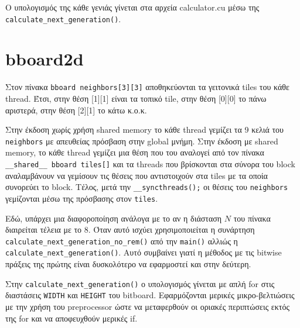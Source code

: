 \begin{sloppypar}
Ο υπολογισμός της κάθε γενιάς γίνεται στα αρχεία calculator.cu μέσω της \lstinline!calculate_next_generation()!.
\end{sloppypar}

\section{bboard2d}
\begin{sloppypar}
Στον πίνακα \lstinline!bboard neighbors[3][3]! αποθηκεύονται τα γειτονικά tiles του κάθε thread.
Έτσι, στην θέση [1][1] είναι τα τοπικό tile,
στην θέση [0][0] το πάνω αριστερά,
στην θέση [2][1] το κάτω κ.ο.κ.
\end{sloppypar}
\begin{sloppypar}
Στην έκδοση χωρίς χρήση shared memory το κάθε thread γεμίζει τα 9 κελιά του \lstinline!neighbors! με απευθείας πρόσβαση στην global μνήμη.
Στην έκδοση με shared memory, το κάθε thread γεμίζει μια θέση που του αναλογεί από τον πίνακα
\lstinline!__shared__ bboard tiles[]! και
τα threads που βρίσκονται στα σύνορα του block αναλαμβάνουν να γεμίσουν τις θέσεις που
αντιστοιχούν στα tiles με τα οποία συνορεύει το block.
Τέλος, μετά την \lstinline!__syncthreads();! οι θέσεις του \lstinline!neighbors! γεμίζονται
μέσω της πρόσβασης στον \lstinline!tiles!.
\end{sloppypar}

\begin{sloppypar}
Εδώ, υπάρχει μια διαφοροποίηση ανάλογα με το αν η διάσταση $N$ του πίνακα διαιρείται τέλεια με το 8.
Όταν αυτό ισχύει χρησιμοποιείται η συνάρτηση \lstinline!calculate_next_generation_no_rem()!
από την \lstinline!main()! αλλιώς η \lstinline!calculate_next_generation()!.
Αυτό συμβαίνει γιατί η μέθοδος με τις bitwise πράξεις της πρώτης είναι δυσκολότερο να εφαρμοστεί και στην δεύτερη.
\end{sloppypar}

Στην \lstinline!calculate_next_generation()! ο υπολογισμός γίνεται με απλή for στις διαστάσεις
\lstinline!WIDTH! και \lstinline!HEIGHT! του bitboard.
Εφαρμόζονται μερικές μικρο-βελτιώσεις με την χρήση του preprocessor ώστε να μεταφερθούν οι
οριακές περιπτώσεις εκτός της for και να αποφευχθούν μερικές if.


